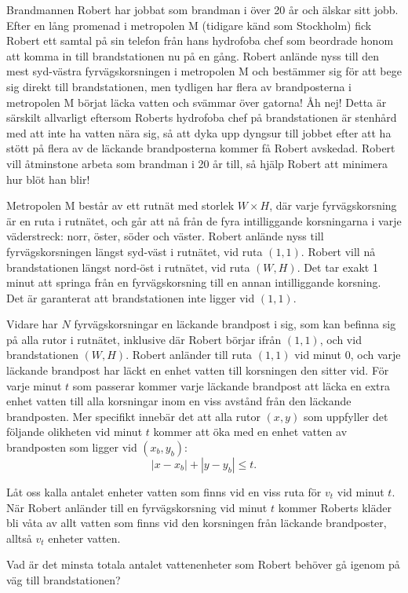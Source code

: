 \noindent
Brandmannen Robert har jobbat som brandman i över 20 år och älskar sitt jobb. 
Efter en lång promenad i metropolen M (tidigare känd som Stockholm) fick Robert ett samtal på sin telefon från hans hydrofoba chef som beordrade honom att komma in till brandstationen nu på en gång.
Robert anlände nyss till den mest syd-västra fyrvägskorsningen i metropolen M och bestämmer sig för att bege sig direkt till brandstationen, 
men tydligen har flera av brandposterna i metropolen M börjat läcka vatten och svämmar över gatorna! Åh nej! 
Detta är särskilt allvarligt eftersom Roberts hydrofoba chef på brandstationen är stenhård med att inte ha vatten nära sig, 
så att dyka upp dyngsur till jobbet efter att ha stött på flera av de läckande brandposterna kommer få Robert avskedad. 
Robert vill åtminstone arbeta som brandman i 20 år till, 
så hjälp Robert att minimera hur blöt han blir!

Metropolen M består av ett rutnät med storlek $W \times H$,
där varje fyrvägskorsning är en ruta i rutnätet, och går att nå från de fyra intilliggande korsningarna i varje
väderstreck: norr, öster, söder och väster. Robert anlände nyss till fyrvägskorsningen längst
syd-väst i rutnätet, vid ruta $(1,1)$. Robert vill nå brandstationen längst nord-öst i rutnätet,
vid ruta $(W,H)$. Det tar exakt 1 minut att springa från en fyrvägskorsning till en annan
intilliggande korsning. Det är garanterat att brandstationen inte ligger vid $(1,1)$. 

Vidare har $N$ fyrvägskorsningar en läckande brandpost i sig, som kan befinna sig på alla rutor i rutnätet, inklusive där Robert börjar ifrån $(1,1)$, och vid brandstationen $(W,H)$. 
Robert anländer till ruta $(1,1)$ vid minut 0, och varje läckande brandpost har läckt en enhet vatten till korsningen
den sitter vid. För varje minut $t$ som passerar kommer varje läckande brandpost
att läcka en extra enhet vatten till alla korsningar inom en viss avstånd från den
läckande brandposten. Mer specifikt innebär det att alla rutor $(x,y)$ som uppfyller det följande olikheten vid minut $t$ kommer att öka med 
en enhet vatten av brandposten som ligger vid $(x_b,y_b)$:
$$
|x-x_b|+|y-y_b|\le t.
$$

Låt oss kalla antalet enheter vatten som finns vid en viss ruta för $v_t$ vid minut $t$. 
När Robert anländer till en fyrvägskorsning vid minut $t$ kommer Roberts kläder bli våta av allt vatten 
som finns vid den korsningen från läckande brandposter, alltså $v_t$ enheter vatten.

Vad är det minsta totala antalet vattenenheter som Robert behöver gå igenom på väg till brandstationen?

